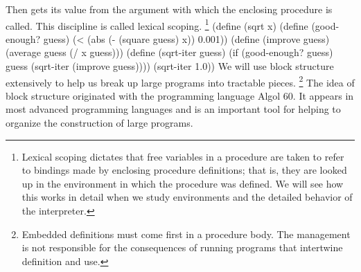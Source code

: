 Then  gets its value from the argument with which the enclosing procedure  is called.
This discipline is called lexical scoping.
\footnote{%
   Lexical scoping dictates that
   free variables in a procedure are taken to refer to bindings made by enclosing procedure definitions;
   that is, they are looked up in the environment in which the procedure was defined.
   We will see how this works in detail 
   when we study environments and the detailed behavior of the interpreter.
}
\startcode
(define (sqrt x)
  (define (good-enough? guess)
    (< (abs (- (square guess) x)) 0.001))
  (define (improve guess)
    (average guess (/ x guess)))
  (define (sqrt-iter guess)
    (if (good-enough? guess)
        guess
        (sqrt-iter (improve guess))))
  (sqrt-iter 1.0))
\stopcode
We will use block structure extensively to help us break up large programs into tractable pieces.
\footnote{%
   Embedded definitions must come first in a procedure body.
   The management is not responsible for the consequences of running programs that intertwine definition and use.
}
The idea of block structure originated with the programming language Algol 60.
It appears in most advanced programming languages
and is an important tool for helping to organize the construction of large programs.
